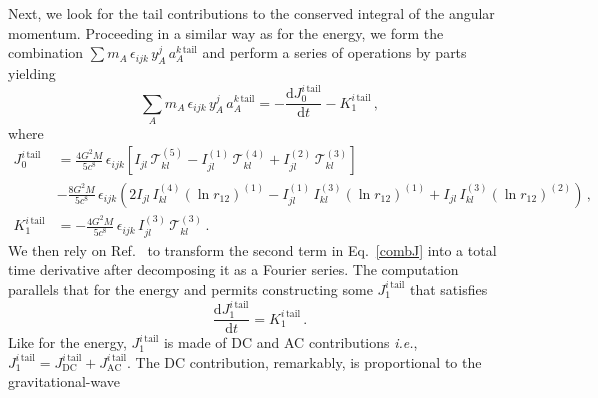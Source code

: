 \documentclass[prd,preprint,superscriptaddress,tightenlines,nofootinbib,
  eqsecnum,showpacs]{revtex4}
\newcommand{\ud}{\mathrm{d}}
\begin{document}
Next, we look for the tail contributions to the conserved integral of the
angular momentum. Proceeding in a similar way as for the energy, we form the combination
$\sum m_A \,\epsilon_{ijk}\,y_A^j\,a_A^{k\,\text{tail}}$ and perform a series
of operations by parts yielding
%
\begin{equation}\label{combJ}
\sum_A m_A \,\epsilon_{ijk}\,y_A^j\,a_A^{k\,\text{tail}} 
= - \frac{\ud J_0^{i\,\text{tail}}}{\ud t} - K_1^{i\,\text{tail}} \,,
\end{equation}
%
where 
%
\begin{subequations}\label{JKtail}
\begin{align}
J_0^{i\,\text{tail}} &= \frac{4G^2M}{5c^8}\,\epsilon_{ijk}\left[
    I_{jl}\,\mathcal{T}_{kl}^{(5)} -
    I_{jl}^{(1)}\,\mathcal{T}_{kl}^{(4)} +
    I_{jl}^{(2)}\,\mathcal{T}_{kl}^{(3)}\right]\nonumber\\& -
  \frac{8G^2M}{5c^8}\,\epsilon_{ijk}\left( 2I_{jl}\,I_{kl}^{(4)}
  (\ln r_{12})^{(1)} - I_{jl}^{(1)}\,I_{kl}^{(3)} (\ln r_{12})^{(1)} +
  I_{jl}\,I_{kl}^{(3)} (\ln r_{12})^{(2)}
  \right)\,,\\ 
K_1^{i\,\text{tail}} &=
  -\frac{4G^2M}{5c^8}\,\epsilon_{ijk}\,I_{jl}^{(3)}
  \,\mathcal{T}_{kl}^{(3)}\,.
\end{align}
\end{subequations}
%
We then rely on Ref.~\cite{BBBFMb} to transform the second term in
Eq.~\eqref{combJ} into a total time derivative after decomposing it as a
Fourier series. The computation parallels that for the energy and permits constructing
some $J_1^{i\,\text{tail}}$ that satisfies
%
\begin{equation}\label{balanceJ}
\frac{\ud J_1^{i\,\text{tail}}}{\ud t} = K_1^{i\,\text{tail}}\,.
\end{equation}
%
Like for the energy, $J_1^{i\,\text{tail}}$ is made of DC and AC contributions
\textit{i.e.},
$J_1^{i\,\text{tail}} = J_\text{DC}^{i\,\text{tail}} +
J_\text{AC}^{i\,\text{tail}}$.
The DC contribution, remarkably, is proportional to the gravitational-wave
\end{document}
